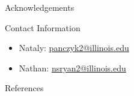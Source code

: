 \documentclass[final]{beamer}
\newlength{\onecolwid}
\newlength{\threecolwid}
\begin{document}
\begin{frame}[t]
\begin{columns}[t,totalwidth=\threecolwid]
\begin{column}{\onecolwid}
\begin{block}{Acknowledgements}
\end{block}



\begin{alertblock}{Contact Information}
	\begin{itemize}
		\item Nataly: \href{mailto:panczyk2@illinois.edu}{panczyk2@illinois.edu}
		\item Nathan: \href{mailto:nsryan2@illinois.edu}{nsryan2@illinois.edu}
	\end{itemize}
	
\end{alertblock}

\begin{block}{References}

	{\footnotesize 
	}
\end{block}





\end{column} %

\end{columns} %

\end{frame} %
\end{document}
